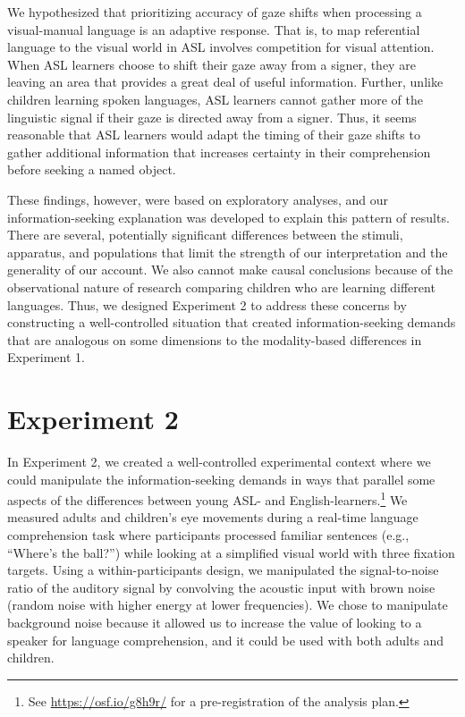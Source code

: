 \documentclass[oneside]{report}
\begin{document}
We hypothesized that prioritizing accuracy of gaze shifts when
processing a visual-manual language is an adaptive response. That is, to
map referential language to the visual world in ASL involves competition
for visual attention. When ASL learners choose to shift their gaze away
from a signer, they are leaving an area that provides a great deal of
useful information. Further, unlike children learning spoken languages,
ASL learners cannot gather more of the linguistic signal if their gaze
is directed away from a signer. Thus, it seems reasonable that ASL
learners would adapt the timing of their gaze shifts to gather
additional information that increases certainty in their comprehension
before seeking a named object.

These findings, however, were based on exploratory analyses, and our
information-seeking explanation was developed to explain this pattern of
results. There are several, potentially significant differences between
the stimuli, apparatus, and populations that limit the strength of our
interpretation and the generality of our account. We also cannot make
causal conclusions because of the observational nature of research
comparing children who are learning different languages. Thus, we
designed Experiment 2 to address these concerns by constructing a
well-controlled situation that created information-seeking demands that
are analogous on some dimensions to the modality-based differences in
Experiment 1.

\section{Experiment 2}\label{experiment-2}

In Experiment 2, we created a well-controlled experimental context where
we could manipulate the information-seeking demands in ways that
parallel some aspects of the differences between young ASL- and
English-learners.\footnote{See \url{https://osf.io/g8h9r/} for a
  pre-registration of the analysis plan.} We measured adults and
children's eye movements during a real-time language comprehension task
where participants processed familiar sentences (e.g., ``Where's the
ball?'') while looking at a simplified visual world with three fixation
targets. Using a within-participants design, we manipulated the
signal-to-noise ratio of the auditory signal by convolving the acoustic
input with brown noise (random noise with higher energy at lower
frequencies). We chose to manipulate background noise because it allowed
us to increase the value of looking to a speaker for language
comprehension, and it could be used with both adults and children.
\end{document}

